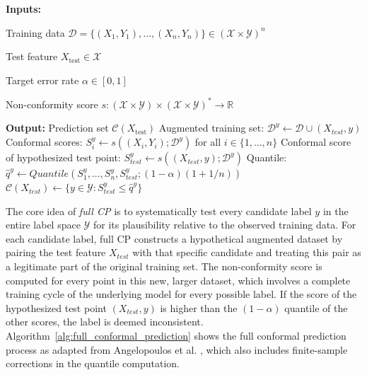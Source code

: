 \begin{algorithm}[t]
    \begin{algorithmic}[1]
        \vspace{1mm}
        \Statex \textbf{Inputs:}
        \Statex \hspace{\algorithmicindent}
        \begin{minipage}[t]{0.92\linewidth}
        Training data
        $\mathcal D = \{(X_1,Y_1),\dots,(X_n,Y_n)\}\in(\mathcal X\times\mathcal Y)^n$
        
        Test feature
        $X_{\mathrm{test}}\in\mathcal X$
        
        Target error rate
        $\alpha\in[0,1]$
        
        Non-conformity score
        $s:(\mathcal X\times\mathcal Y)\times(\mathcal X\times\mathcal Y)^*
        \to \mathbb R$
        \end{minipage}
        
        \vspace{1mm}
        \Statex \textbf{Output:}
        \Statex \hspace{\algorithmicindent}
        Prediction set $\mathcal C(X_{\mathrm{test}})$
        \Statex \hrulefill
            \State Augmented training set: $\mathcal{D}^y \leftarrow \mathcal{D} \cup (X_{test}, y)$
            \State Conformal scores: $S_i^y \leftarrow s((X_i, Y_i); \mathcal{D}^y)$ for all $i \in \{1, \dots, n\}$
            \State Conformal score of hypothesized test point: $S_{test}^y \leftarrow s((X_{test}, y); \mathcal{D}^y)$
            \State Quantile: $\hat{q}^y \leftarrow Quantile(S_1^y, \dots, S_n^y, S_{test}^y; (1 - \alpha)(1 + 1/n))$
        \EndFor
        \State \Return $\mathcal{C}(X_{test}) \leftarrow \{y \in \mathcal{Y} : S_{test}^y \le \hat{q}^y\}$
    \end{algorithmic}
    \caption{Full Conformal Prediction for Classification}
    \label{alg:full_conformal_prediction}
\end{algorithm}

The core idea of \textit{full \gls{CP}} is to systematically test every candidate label $y$ in the entire label space $\mathcal{Y}$ for its plausibility relative to the observed training data. For each candidate label, full \gls{CP} constructs a hypothetical augmented dataset by pairing the test feature $X_{test}$ with that specific candidate and treating this pair as a legitimate part of the original training set. The non-conformity score is computed for every point in this new, larger dataset, which involves a complete training cycle of the underlying model for every possible label. If the score of the hypothesized test point $(X_{test}, y)$ is higher than the $(1 - \alpha)$ quantile of the other scores, the label is deemed inconsistent. Algorithm~\ref{alg:full_conformal_prediction} shows the full conformal prediction process as adapted from Angelopoulos et al. \cite{Angelopoulos-ConformalPredictionTheory-2025}, which also includes finite-sample corrections in the quantile computation.

